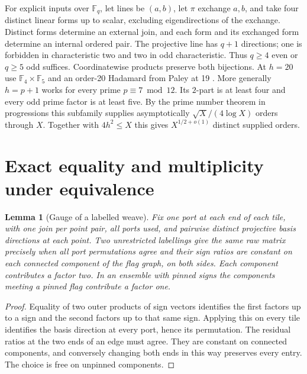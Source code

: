 \documentclass[11pt,reqno]{amsart}
\newtheorem{lemma}[theorem]{Lemma}
\theoremstyle{remark}\newtheorem{remark}[theorem]{Remark}
\begin{document}
For explicit inputs over \(\mathbb F_q\), let lines be \((a,b)\), let \(\pi\) exchange \(a,b\), and take four distinct linear forms up to scalar, excluding eigendirections of the exchange. Distinct forms determine an external join, and each form and its exchanged form determine an internal ordered pair. The projective line has \(q+1\) directions; one is forbidden in characteristic two and two in odd characteristic. Thus \(q\ge4\) even or \(q\ge5\) odd suffices. Coordinatewise products preserve both bijections. At \(h=20\) use \(\mathbb F_4\times\mathbb F_5\) and an order-20 Hadamard from Paley at 19 \cite{paley}. More generally \(h=p+1\) works for every prime \(p\equiv7\bmod12\). Its \(2\)-part is at least four and every odd prime factor is at least five. By the prime number theorem in progressions this subfamily supplies asymptotically \(\sqrt X/(4\log X)\) orders through \(X\). Together with \(4h^2\le X\) this gives \(X^{1/2+o(1)}\) distinct supplied orders.

\section{Exact equality and multiplicity under equivalence}\label{sec:gauge}
\begin{lemma}[Gauge of a labelled weave]\label{lem:gauge}
Fix one port at each end of each tile, with one join per point pair, all ports used, and pairwise distinct projective basis directions at each point. Two unrestricted labellings give the same raw matrix precisely when all port permutations agree and their sign ratios are constant on each connected component of the flag graph, on both sides. Each component contributes a factor two. In an ensemble with pinned signs the components meeting a pinned flag contribute a factor one.
\end{lemma}
\begin{proof}
Equality of two outer products of sign vectors identifies the first factors up to a sign and the second factors up to that same sign. Applying this on every tile identifies the basis direction at every port, hence its permutation. The residual ratios at the two ends of an edge must agree. They are constant on connected components, and conversely changing both ends in this way preserves every entry. The choice is free on unpinned components.
\end{proof}
\end{document}

